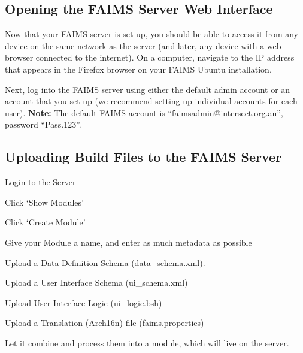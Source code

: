 \subsection[opening-the-faims-server-web-interface]{Opening the FAIMS Server Web Interface}

Now that your FAIMS server is set up, you should be able to access it from any device on the same network as the server (and later, any device with a web browser connected to the internet). On a computer, navigate to the IP address that appears in the Firefox browser on your FAIMS Ubuntu installation.

{}

Next, log into the FAIMS server using either the default admin account or an account that you set up (we recommend setting up individual accounts for each user). {\bf Note:} The default FAIMS account is “faimsadmin@intersect.org.au”, password “Pass.123”.

{}

\subsection[uploading-build-files-to-the-faims-server]{Uploading Build Files to the FAIMS Server}

\startitemize[n][stopper=.]
\item
  \startblockquote
  Login to the Server
  \stopblockquote
\item
  \startblockquote
  Click ‘Show Modules'
  \stopblockquote
\item
  \startblockquote
  Click ‘Create Module'
  \stopblockquote
\item
  \startblockquote
  Give your Module a name, and enter as much metadata as possible
  \stopblockquote
\item
  \startblockquote
  Upload a Data Definition Schema (data_schema.xml).
  \stopblockquote
\item
  \startblockquote
  Upload a User Interface Schema (ui_schema.xml)
  \stopblockquote
\item
  \startblockquote
  Upload User Interface Logic (ui_logic.bsh)
  \stopblockquote
\item
  \startblockquote
  Upload a Translation (Arch16n) file (faims.properties)
  \stopblockquote
\stopitemize

Let it combine and process them into a module, which will live on the server.


